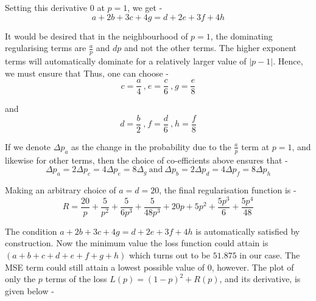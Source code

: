 \documentclass{article}
\begin{document}
\justify
Setting this derivative 0 at $p=1$, we get -
$$\displaystyle{a + 2b + 3c + 4g = d + 2e + 3f + 4h}$$

\justify
It would be desired that in the neighbourhood of $p=1$, the dominating regularising terms are $\displaystyle{\frac{a}{p}}$ and $dp$ and not the other terms. The higher exponent terms will automatically dominate for a relatively larger value of $\left|p-1\right|$. Hence, we must ensure that  Thus, one can choose -
$$\displaystyle{
c =  \frac{a}{4} \ \text{,} \ e = \frac{c}{6} \ \text{,} \ g = \frac{e}{8}
}$$

\justify
and
$$\displaystyle{
d = \frac{b}{2} \ \text{,} \ f = \frac{d}{6} \ \text{,} \ h = \frac{f}{8}
}$$

\justify
If we denote $\displaystyle{\Delta p_a}$ as the change in the probability due to the $\displaystyle{\frac{a}{p}}$ term at $p=1$, and likewise for other terms, then the choice of co-efficients above ensures that -
$$\displaystyle{
\Delta p_a = 2\Delta p_c = 4\Delta p_e = 8\Delta_g \ \text{and} \ \Delta p_b = 2\Delta p_d = 4\Delta p_f = 8\Delta p_h
}
$$

\justify
Making an arbitrary choice of $a = d = 20$, the final regularisation function is -
$$\displaystyle{
R = \frac{20}{p} + \frac{5}{p^2} + \frac{5}{6p^3} + \frac{5}{48p^3} + 20p + 5p^2 + \frac{5p^3}{6} + \frac{5p^4}{48}
}$$

\justify
The condition $a + 2b + 3c + 4g = d + 2e + 3f + 4h$ is automatically satisfied by construction. Now the minimum value the loss function could attain is $\left(a+b+c+d+e+f+g+h\right)$ which turns out to be $51.875$ in our case. The MSE term could still attain a lowest possible value of 0, however. The plot of only the $p$ terms of the loss $L(p) = (1-p)^2 + R(p)$, and its derivative, is given below -
\end{document}

